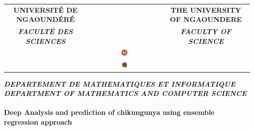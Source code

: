 \begin{titlepage}
\begin{center}

\begin{tabular}{ccc}
\bf{UNIVERSITÉ DE NGAOUNDÉRÉ} &  ~& \bf{THE UNIVERSITY OF NGAOUNDERE} \\[0.2cm]
 \bf{\it{FACULTÉ DES SCIENCES}} & ~ & \bf{\it{FACULTY OF SCIENCE}} \\
   ~& \includegraphics[width=0.10\textwidth]{./LogoUnivNg} & ~\\[0.2cm]
   ~ & \includegraphics[width=0.10\textwidth]{./LogoUnivNgFS} & ~ \\[0.8cm]
	
\end{tabular}


\textsc{\Large  \textit{\textbf{DEPARTEMENT DE MATHEMATIQUES ET INFORMATIQUE}}}\\[0.1cm]
\textsc{\Large  \textit{\textbf{DEPARTMENT OF MATHEMATICS AND COMPUTER SCIENCE}}}\\[0.8cm]



\HRule \\[0.2cm]

{\huge \bfseries Deep Analysis and prediction of chikungunya using ensemble regression approach  \\[0.2cm] }


\end{center}
\end{titlepage}

